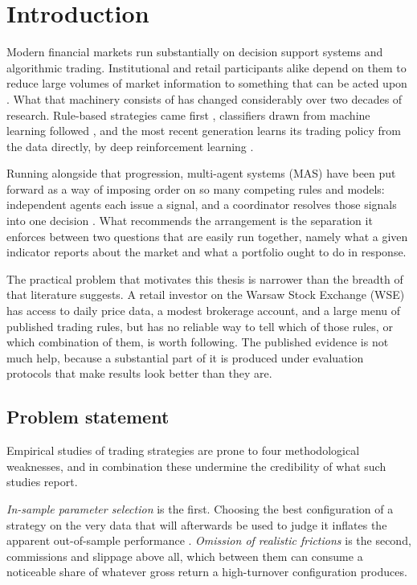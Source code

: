 \chapter{Introduction}\label{chap:introduction}

Modern financial markets run substantially on decision support systems and algorithmic trading. Institutional and retail participants alike depend on them to reduce large volumes of market information to something that can be acted upon \cite{hendershott_does_2011}. What that machinery consists of has changed considerably over two decades of research. Rule-based strategies came first \cite{brock1992}, classifiers drawn from machine learning followed \cite{gerlein2016,fischerkrauss2018}, and the most recent generation learns its trading policy from the data directly, by deep reinforcement learning \cite{huang2022,shavandi2022,hambly2023}.

Running alongside that progression, multi-agent systems (MAS) have been put forward as a way of imposing order on so many competing rules and models: independent agents each issue a signal, and a coordinator resolves those signals into one decision \cite{luo2002,korczak2013,hernes2016,hernes2024}. What recommends the arrangement is the separation it enforces between two questions that are easily run together, namely what a given indicator reports about the market and what a portfolio ought to do in response.

The practical problem that motivates this thesis is narrower than the breadth of that literature suggests. A retail investor on the Warsaw Stock Exchange (WSE) has access to daily price data, a modest brokerage account, and a large menu of published trading rules, but has no reliable way to tell which of those rules, or which combination of them, is worth following. The published evidence is not much help, because a substantial part of it is produced under evaluation protocols that make results look better than they are.

\section{Problem statement}\label{sec:problem}

Empirical studies of trading strategies are prone to four methodological weaknesses, and in combination these undermine the credibility of what such studies report.

\emph{In-sample parameter selection} is the first. Choosing the best configuration of a strategy on the very data that will afterwards be used to judge it inflates the apparent out-of-sample performance \cite{bailey2014,harvey2016}. \emph{Omission of realistic frictions} is the second, commissions and slippage above all, which between them can consume a noticeable share of whatever gross return a high-turnover configuration produces.

